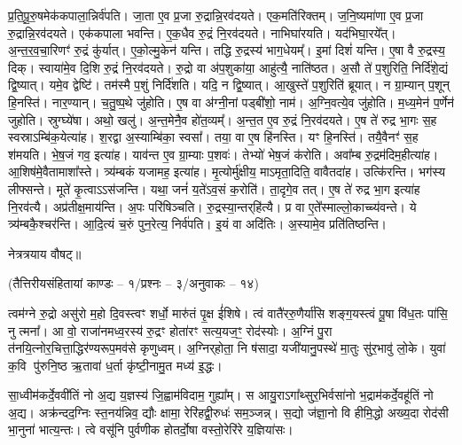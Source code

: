 प्र॒ति॒पू॒रु॒षमेक॑कपाला॒न्निर्व॑पति। जा॒ता ए॒व प्र॒जा रु॒द्रान्नि॒रव॑दयते। एक॒मति॑रिक्तम्। ज॒नि॒ष्यमा॑णा ए॒व प्र॒जा रु॒द्रान्नि॒रव॑दयते। एक॑कपाला भवन्ति। ए॒क॒धैव रु॒द्रं नि॒रव॑दयते। नाभिघा॑रयति। यद॑भिघा॒रये᳚त्। अ॒न्त॒र॒व॒चा॒रिणꣳ॑ रु॒द्रं कु॑र्यात्। ए॒को॒ल्मु॒केन॑ यन्ति। 
तद्धि रु॒द्रस्य॑ भाग॒धेयम्᳚। इ॒मां दिशं॑ यन्ति। ए॒षा वै रु॒द्रस्य॒ दिक्। स्वाया॑मे॒व दि॒शि रु॒द्रं नि॒रव॑दयते। रु॒द्रो वा अ॑प॒शुका॑या॒ आहु॑त्यै॒ नाति॑ष्ठत। अ॒सौ ते॑ प॒शुरिति॒ निर्दि॑शे॒द्यं द्वि॒ष्यात्। यमे॒व द्वेष्टि॑। तम॑स्मै प॒शुं निर्दि॑शति। यदि॒ न द्वि॒ष्यात्। आ॒खुस्ते॑ प॒शुरिति॑ ब्रूयात्। 
न ग्रा॒म्यान् प॒शून् हि॒नस्ति॑। नार॒ण्यान्। च॒तु॒ष्प॒थे जु॑होति। ए॒ष वा अ॑ग्नी॒नां पड्बी॑शो॒ नाम॑। अ॒ग्नि॒वत्ये॒व जु॑होति। म॒ध्य॒मेन॑ प॒र्णेन॑ जुहोति। स्रुग्घ्ये॑षा। अथो॒ खलु॑। अ॒न्त॒मेनै॒व हो॑त॒व्यम्᳚। अ॒न्त॒त ए॒व रु॒द्रं नि॒रव॑दयते। 
ए॒ष ते॑ रुद्र भा॒गः स॒ह स्वस्राऽम्बि॑क॒येत्या॑ह। श॒रद्वा अ॒स्याम्बि॑का॒ स्वसा᳚। तया॒ वा ए॒ष हि॑नस्ति। यꣳ हि॒नस्ति॑। तयै॒वैनꣳ॑ स॒ह श॑मयति। भे॒ष॒जं गव॒ इत्या॑ह। याव॑न्त ए॒व ग्रा॒म्याः प॒शवः॑। तेभ्यो॑ भेष॒जं क॑रोति। अवा᳚म्ब रु॒द्रम॑दिम॒हीत्या॑ह। आ॒शिष॑मे॒वैतामाशा᳚स्ते। 
त्र्य॑म्बकं यजामह॒ इत्या॑ह। मृ॒त्योर्मु॑क्षीय॒ माऽमृता॒दिति॒ वावैतदा॑ह। उत्कि॑रन्ति। भग॑स्य लीफ्सन्ते। मूते॑ कृ॒त्वाऽऽस॑जन्ति। यथा॒ जनं॑ य॒ते॑ऽव॒सं क॒रोति॑। ता॒दृगे॒व तत्। ए॒ष ते॑ रुद्र भा॒ग इत्या॑ह नि॒रव॑त्यै। अप्र॑तीक्ष॒माय॑न्ति। अ॒पः परि॑षिञ्चति। \mbox{रु॒द्रस्या॒न्तर्‌\mbox{}हि॑त्यै}। प्र वा ए॒ते᳚स्माल्लो॒काच्च्य॑वन्ते। ये त्र्य॑म्बकै॒श्चर॑न्ति। आ॒दि॒त्यं च॒रुं पुन॒रेत्य॒ निर्व॑पति। इ॒यं वा अदि॑तिः। अ॒स्यामे॒व प्रति॑तिष्ठन्ति। 

नेत्रत्रयाय वौषट्॥

{\small \closesection}



{}
\centerline{\normalsize (तैत्तिरीयसंहितायां काण्डः – १/प्रश्नः – ३/अनुवाकः – १४)}

त्वम॑ग्ने रु॒द्रो असु॑रो म॒हो दि॒वस्त्वꣳ शर्धो॒ मारु॑तं पृ॒क्ष ई॑शिषे। त्वं वातै॑ररु॒णैर्या॑सि शङ्ग॒यस्त्वं पू॒षा वि॑ध॒तः पा॑सि॒ नु त्मना᳚।
आ वो॒ राजा॑नमध्व॒रस्य॑ रु॒द्रꣳ होता॑रꣳ सत्य॒यज॒ꣳ॒ रोद॑स्योः। अ॒ग्निं पु॒रा त॑नयि॒त्नोर॒चित्ता॒द्धिर॑ण्यरूप॒मव॑से कृणुध्वम्। अ॒ग्निर्‌होता॒ नि ष॑सादा॒ यजी॑यानु॒पस्थे॑ मा॒तुः सु॑र॒भावु॑ लो॒के। युवा॑ क॒वि पु॑रुनि॒ष्ठ ऋ॒तावा॑ ध॒र्ता कृ॑ष्टी॒नामु॒त मध्य॑ इ॒द्धः। 

सा॒ध्वीम॑कर्दे॒ववी॑तिं नो अ॒द्य य॒ज्ञस्य॑ जि॒ह्वाम॑विदाम॒ गुह्या᳚म्। स आयु॒राऽगा᳚थ्सुर॒भिर्वसा॑नो भ॒द्राम॑कर्दे॒वहू॑तिं नो अ॒द्य। अक्र॑न्दद॒ग्निः स्त॒नय॑न्निव॒ द्यौः क्षामा॒ रेरि॑हद्वी॒रुधः॑ सम॒ञ्जन्न्। स॒द्यो ज॑ज्ञा॒नो वि हीमि॒द्धो अख्य॒दा रोद॑सी भा॒नुना॑ भात्य॒न्तः। त्वे वसू॑नि पुर्वणीक होतर्दो॒षा वस्तो॒रेरि॑रे य॒ज्ञिया॑सः। 

